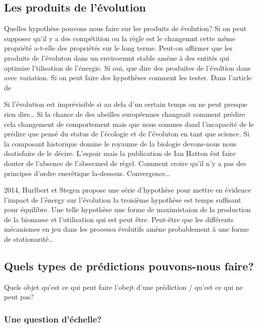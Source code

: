 \subsection*{Les produits de
l'évolution}\label{les-produits-de-luxe9volution}

Quelles hypothèse pouvons nous faire sur les produits de évolution? Si
on peut supposer qu'il y a des compétition ou la règle est le changemnt
cette même propriété a-t-elle des propriétés sur le long terme. Peut-on
affirmer que les produits de l'évoluton dans un enviroemnt stable amène
à des entités qui optimise l'tilisation de l'énergie. Si oui, que dire
des produites de l'évoltion dans avec variation. Si on peut faire des
hypothèses comment les tester. Dans l'article de

Si l'évolution est imprévisible si au dela d'un certain temps on ne peut
presque rien dire\ldots{} Si la chance de des abeilles européennes
changeait comment prédire cela changement de comportement mais que nous
sommes dand l'incapacité de le prédire que pensé du status de l'écologie
et de l'évoluton en tant que science. Si la composant historique domine
le royaume de la biologie devons-nous nous dsatisfaire de le décire.
L'espoir mais la publication de Ian Hatton êut faire douter de l'absence
de l'absecmed de règel. Comment croire qu'il n'y a pas des principes
d'ordre enerétique la-dessous. Convergence\ldots{}

2014, Hurlbert et Stegen propose une série d'hypothèse pour mettre en
évidence l'impact de l'énergy sur l'évolution la troisième hypothèse est
temps suffisant pour équilibre. Une telle hypothèse une forme de
maximistaion de la production de la biomasse et l'utilisation qui est
peut être. Peut-être que les différents mécanismes en jeu dans les
processu évolutifs amène probablement à une forme de
stationarité\ldots{}

\subsection*{Quels types de prédictions pouvons-nous
faire?}\label{quels-types-de-pruxe9dictions-pouvons-nous-faire}

Quels objet qu'est ce qui peut faire l'obejt d'une prédiction / qu'est
ce qui ne peut pas?

\subsubsection{Une question d'échelle?}\label{une-question-duxe9chelle}

